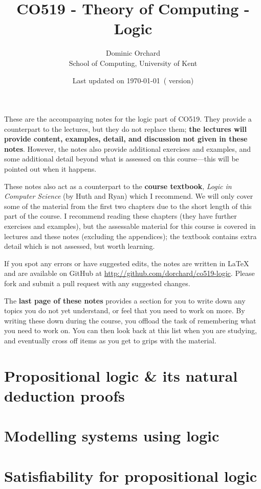 \documentclass[a4paper]{article}
\title{\vspace{-3em}CO519 - Theory of Computing - Logic}
\author{Dominic Orchard \\
  {\small{School of Computing, University of Kent}}}
\date{Last updated on \today\ {\small{(\version{} version)}}}
\theoremstyle{definition}
\begin{document}
\maketitle

\noindent
These are the accompanying notes for the logic part of CO519. They
provide a counterpart to the lectures, but they do not replace them; \textbf{the
lectures will provide content, examples, detail, and discussion not given in
these notes}.  However, the notes also provide additional exercises and
examples, and some additional detail beyond what is assessed on this
course---this will be pointed out when it happens.

These notes also act as a counterpart to the \textbf{course textbook},
\emph{Logic in Computer Science} (by Huth and Ryan) which I
recommend. We will only cover some of the material from the first two
chapters due to the short length of this part of the course. I
recommend reading these chapters (they have further exercises and
examples), but the assessable material for this course is covered in
lectures and these notes (excluding the appendices); the textbook
contains extra detail which is not assessed, but worth learning.

If you spot any errors or have suggested edits, the notes are written
in LaTeX and are available on GitHub at
\url{http://github.com/dorchard/co519-logic}. Please fork and submit a
pull request with any suggested changes.

The \textbf{last page of these notes} provides a section for you to
write down any topics you do not yet understand, or feel that you need
to work on more. By writing these down during the course, you offload
the task of remembering what you need to work on. You can then look
back at this list when you are studying, and eventually cross off items
as you get to grips with the material.

\part{Propositional logic \& its natural deduction proofs}


\part{Modelling systems using logic}
\setcounter{section}{0}


\part{Satisfiability for propositional logic}
\setcounter{section}{0}

\end{document}
